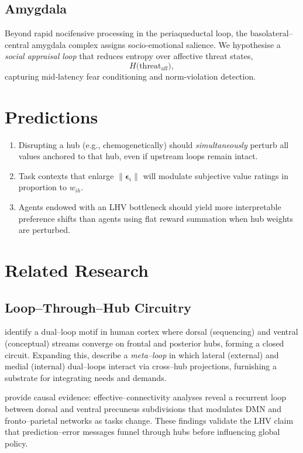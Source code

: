 \documentclass[11pt]{article}
\begin{document}
\subsection{Amygdala}
Beyond rapid nocifensive processing in the periaqueductal loop, the basolateral–central amygdala complex assigns socio‑emotional salience.  
We hypothesise a \emph{social appraisal loop} that reduces entropy over affective threat states,
\[
H\!\bigl(\text{threat}_{\text{aff}}\bigr),
\]
capturing mid‑latency fear conditioning and norm‑violation detection.

\section{Predictions}
\begin{enumerate}
 \item Disrupting a hub (e.g., chemogenetically) should \emph{simultaneously} perturb all values anchored to that hub, even if upstream loops remain intact.
 \item Task contexts that enlarge $\lVert\boldsymbol{\epsilon}_i\rVert$ will modulate subjective value ratings in proportion to $w_{ih}$.
 \item Agents endowed with an LHV bottleneck should yield more interpretable preference shifts than agents using flat reward summation when hub weights are perturbed.
\end{enumerate}

\section{Related Research}\label{sec:related}

\subsection{Loop--Through--Hub Circuitry}
\citet{weiller2022} identify a dual--loop motif in human cortex where dorsal (sequencing) and ventral (conceptual) streams converge on frontal and posterior hubs, forming a closed circuit. Expanding this, \citet{weiller2025} describe a \emph{meta--loop} in which lateral (external) and medial (internal) dual--loops interact via cross--hub projections, furnishing a substrate for integrating needs and demands.

\citet{lyu2021} provide causal evidence: effective--connectivity analyses reveal a recurrent loop between dorsal and ventral precuneus subdivisions that modulates DMN and fronto--parietal networks as tasks change. These findings validate the LHV claim that prediction--error messages funnel through hubs before influencing global policy.
\end{document}
